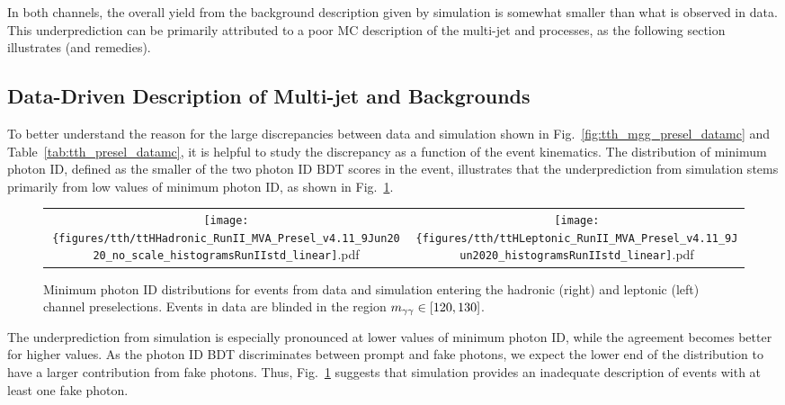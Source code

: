 In both channels, the overall yield from the background description given by simulation is somewhat smaller than what is observed in data.
This underprediction can be primarily attributed to a poor MC description of the multi-jet and \gjets processes, as the following section illustrates (and remedies). 

\subsection{Data-Driven Description of Multi-jet and \gjets Backgrounds} \label{sec:tth_datadriven}
To better understand the reason for the large discrepancies between data and simulation shown in Fig.~\ref{fig:tth_mgg_presel_datamc} and Table~\ref{tab:tth_presel_datamc}, it is helpful to study the discrepancy as a function of the event kinematics.
The distribution of minimum photon ID, defined as the smaller of the two photon ID BDT scores in the event, illustrates that the underprediction from simulation stems primarily from low values of minimum photon ID, as shown in Fig.~\ref{fig:tth_phoID_presel_datamc}.
\begin{figure} [h!]
    \centering
    \begin{tabular}{c c}
        \texttt{[image: \{figures/tth/ttHHadronic\_RunII\_MVA\_Presel\_v4.11\_9Jun2020\_no\_scale\_histogramsRunIIstd\_linear]}.pdf} &
        \texttt{[image: \{figures/tth/ttHLeptonic\_RunII\_MVA\_Presel\_v4.11\_9Jun2020\_histogramsRunIIstd\_linear]}.pdf}
    \end{tabular}
    \caption{Minimum photon ID distributions for events from data and simulation entering the hadronic (right) and leptonic (left) channel preselections. Events in data are blinded in the region $m_{\gamma\gamma} \in [120, 130]$.}
    \label{fig:tth_phoID_presel_datamc}
\end{figure}

The underprediction from simulation is especially pronounced at lower values of minimum photon ID, while the agreement becomes better for higher values. 
As the photon ID BDT discriminates between prompt and fake photons, we expect the lower end of the distribution to have a larger contribution from fake photons.
Thus, Fig.~\ref{fig:tth_phoID_presel_datamc} suggests that simulation provides an inadequate description of events with at least one fake photon. 

